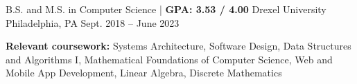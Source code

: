 

\begin{cventries}

  \cventry
  {B.S. and M.S. in Computer Science | \textbf{GPA: 3.53 / 4.00}} %
  {Drexel University} %
  {Philadelphia, PA} %
  {Sept. 2018 -- June 2023} %
  {
    \begin{cvitems} %
      \item {\color{darktext} \textbf{Relevant coursework:}
            Systems Architecture,
            Software Design,
            Data Structures and Algorithms I,
            Mathematical Foundations of Computer Science,
            Web and Mobile App Development,
            Linear Algebra,
            Discrete Mathematics
            }
    \end{cvitems}
  }

\end{cventries}
